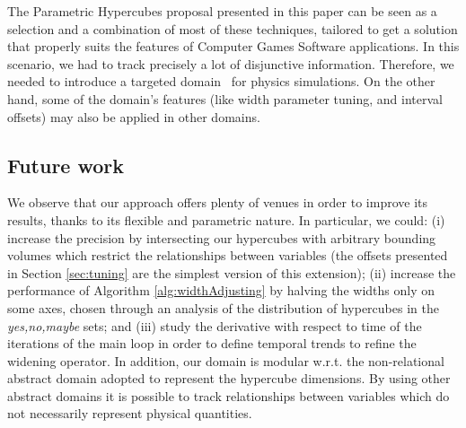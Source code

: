 The Parametric Hypercubes proposal presented in this paper can be seen as a selection and a combination of most of these techniques, tailored to get a solution that properly suits the features of Computer Games Software applications. In this scenario, we had to track precisely a lot of disjunctive information. Therefore, we needed to introduce a targeted domain \adomain\ for physics simulations. On the other hand, some of the domain's features (like width parameter tuning, and interval offsets) may also be applied in other domains. 

\subsection{Future work}

We observe that our approach offers plenty of venues in order to improve its results, thanks to its flexible and parametric nature. In particular, we could: (i) increase the precision by intersecting our hypercubes with arbitrary bounding volumes which restrict the relationships between variables (the offsets presented in Section \ref{sec:tuning} are the simplest version of this extension); (ii) increase the performance of Algorithm \ref{alg:widthAdjusting} by halving the widths only on some axes, chosen through an analysis of the distribution of hypercubes in the \emph{yes,no,maybe} sets; and (iii) study the derivative with respect to time of the iterations of the main loop in order to define temporal trends to refine the widening operator.
In addition, our domain is modular w.r.t. the non-relational abstract domain adopted to represent the hypercube dimensions. By using other abstract domains it is possible to track relationships between variables which do not necessarily represent physical quantities.

